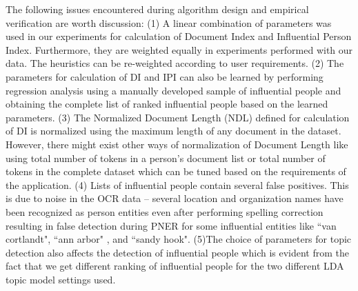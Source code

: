 The following issues encountered during algorithm design and empirical verification are worth discussion:
(1)  A linear combination of parameters was used in our experiments for calculation of Document Index and Influential Person Index. Furthermore, they are weighted equally in experiments performed with our data. The heuristics can be re-weighted according to user requirements. 
(2) The parameters for calculation of DI and IPI can also be learned by performing regression analysis using a manually developed sample of influential people and obtaining the complete list of ranked influential people based on the learned parameters.
(3) The Normalized Document Length (NDL) defined for calculation of DI is normalized using the maximum length of any document in the dataset. However, there might exist other ways of normalization of Document Length like using total number of tokens in a person's document list or total number of tokens in the complete dataset which can be tuned based on the requirements of the application.
(4) Lists of influential people contain several false positives. This is due to noise in the OCR data -- several location and organization names have been recognized as person entities even after performing spelling correction resulting in false detection during PNER for some influential entities like ``van cortlandt", ``ann arbor" ,  and ``sandy hook".  
(5)The choice of parameters for topic detection also affects the detection of influential people which is evident from the fact that we get different ranking of influential people for the two different LDA topic model settings used. 





